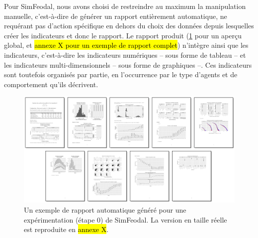 	Pour SimFeodal, nous avons choisi de restreindre au maximum la manipulation manuelle, c'est-à-dire de générer un rapport entièrement automatique, ne requérant pas d'action spécifique en dehors du choix des données depuis lesquelles créer les indicateurs et donc le rapport.
	Le rapport produit (\cref{fig:simfeodal_rapport_mini} pour un aperçu global, et \hl{annexe X pour un exemple de rapport complet}) n'intègre ainsi que les indicateurs, c'est-à-dire les indicateurs numériques -- sous forme de tableau -- et les indicateurs multi-dimensionnels -- sous forme de graphiques --.
	Ces indicateurs sont toutefois organisés par partie, en l'occurrence par le type d'agents et de comportement qu'ils décrivent. 
	
	\begin{figure}[H]
		\captionsetup{width=\linewidth}
		\includegraphics[width=\linewidth]{img/SimFeodal_Rapport_exemple.png}
		\caption{Un exemple de rapport automatique généré pour une expérimentation (étape 0) de SimFeodal. La version en taille réelle est reproduite en \hl{annexe X}.} 
		\label{fig:simfeodal_rapport_mini} 
	\end{figure}
	
